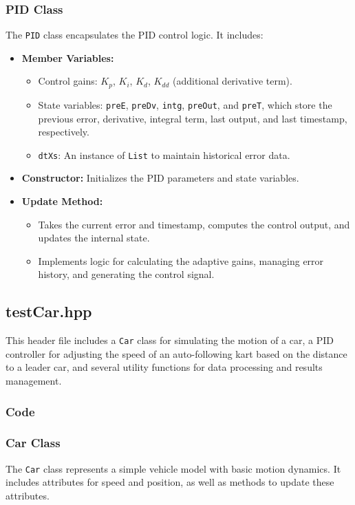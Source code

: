 \documentclass[a4paper,12pt]{article}
\begin{document}
\subsubsection{PID Class}
The \texttt{PID} class encapsulates the PID control logic. It includes:
\begin{itemize}
\item \textbf{Member Variables:}
\begin{itemize}
\item Control gains: $K_p$, $K_i$, $K_d$, $K_{dd}$ (additional derivative term).
\item State variables: \texttt{preE}, \texttt{preDv}, \texttt{intg}, \texttt{preOut}, and \texttt{preT}, which store the previous error, derivative, integral term, last output, and last timestamp, respectively.
\item \texttt{dtXs}: An instance of \texttt{List} to maintain historical error data.
\end{itemize}
\item \textbf{Constructor:} Initializes the PID parameters and state variables.
\item \textbf{Update Method:}
\begin{itemize}
\item Takes the current error and timestamp, computes the control output, and updates the internal state.
\item Implements logic for calculating the adaptive gains, managing error history, and generating the control signal.
\end{itemize}
\end{itemize}
\subsection{testCar.hpp}
This header file includes a \texttt{Car} class for simulating the motion of a car, a PID controller for adjusting the speed of an auto-following kart based on the distance to a leader car, and several utility functions for data processing and results management.
\subsubsection{Code}

\subsubsection{Car Class}
The \texttt{Car} class represents a simple vehicle model with basic motion dynamics. It includes attributes for speed and position, as well as methods to update these attributes.
\end{document}
